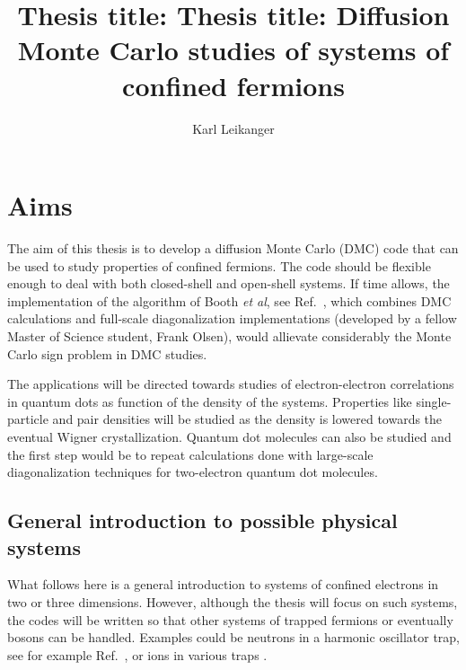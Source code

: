 \documentclass[twocolumn]{revtex4}
\begin{document}
\title{Thesis title: Thesis title: Diffusion Monte Carlo studies of systems of confined fermions}
\author{Karl Leikanger}
\maketitle
\section*{Aims}
The aim of this thesis is to develop a diffusion Monte Carlo (DMC) code that can be used to study properties 
of confined fermions. The code should be flexible enough to deal with both closed-shell and open-shell systems.
If time allows, the implementation of the algorithm of Booth {\em et al}, see Ref.~\cite{booth2009}, which combines DMC calculations and full-scale diagonalization implementations (developed by a fellow Master of Science student, Frank Olsen), would allievate considerably the Monte Carlo sign problem in DMC studies.

The applications will be directed towards studies of electron-electron correlations in quantum dots
as function of the density of the systems. Properties like single-particle and pair densities will be studied
as the density is lowered towards the eventual Wigner crystallization. 
Quantum dot molecules can also be studied and the first step would be to repeat calculations done with
large-scale diagonalization techniques for two-electron quantum dot molecules.

\subsection*{General introduction to possible physical systems}


What follows here is a general introduction to systems of confined electrons in two or three dimensions.
However, although the thesis will focus on such systems, the codes will be written so 
that other systems of trapped 
fermions or eventually bosons can be handled. Examples could be neutrons in a harmonic oscillator trap, see for example Ref.~\cite{bogner2011}, or ions in various traps \cite{yoram2008}.  
\end{document}
